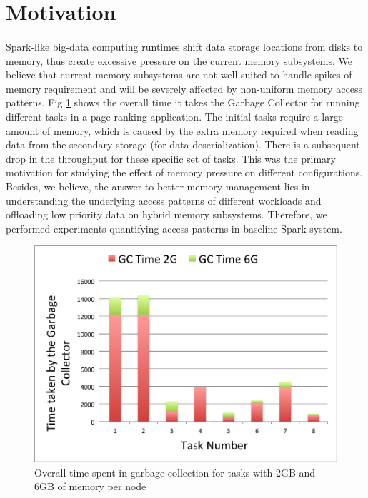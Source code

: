 \section{Motivation} 
\label{sec:motivation}
\paragraph{}
Spark-like big-data computing runtimes shift data storage locations from
disks to memory, thus create excessive pressure on the current memory
subsystems.  We believe that current memory subsystems are not well
suited to handle spikes of memory requirement and will be severely
affected by non-uniform memory access patterns. Fig \ref{fig:fig1} shows
the overall time it takes the Garbage Collector for running different
tasks in a page ranking application. The initial tasks require a large
amount of memory, which is caused by the extra memory required when
reading data from the secondary storage (for data deserialization).
There is a subsequent drop in the throughput for these specific set of
tasks. This was the primary motivation for studying the effect of memory
pressure on different configurations. Besides, we believe, the answer to
better memory management lies in understanding the underlying access
patterns of different workloads and offloading low priority data on
hybrid memory subsystems. Therefore, we performed experiments
quantifying access patterns in baseline Spark system.

\begin{figure}[!ht]
\caption{Overall time spent in garbage collection for tasks with 2GB and 6GB of memory per node}
\label{fig:fig1}
\includegraphics[scale=0.50]{./images/image1.png}
\end{figure}

